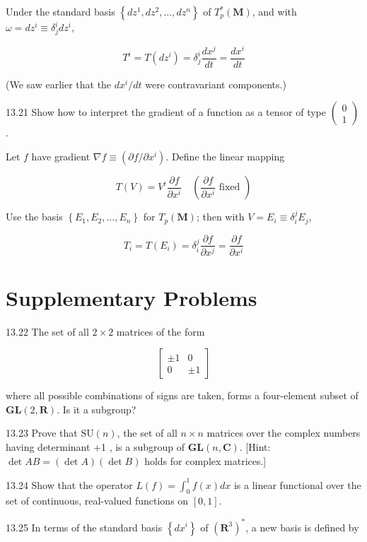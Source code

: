 \documentclass[10pt]{article}
\begin{document}
Under the standard basis $\left\{d z^{1}, d z^{2}, \ldots, d z^{n}\right\}$ of $T_{p}^{*}(\mathbf{M})$, and with $\omega=d z^{i} \equiv \delta_{j}^{i} d z^{i}$,

$$
T^{i}=T\left(d z^{i}\right)=\delta_{j}^{i} \frac{d x^{j}}{d t}=\frac{d x^{i}}{d t}
$$

(We saw earlier that the $d x^{i} / d t$ were contravariant components.)

13.21 Show how to interpret the gradient of a function as a tensor of type $\left(\begin{array}{l}0 \\ 1\end{array}\right)$.

Let $f$ have gradient $\nabla f \equiv\left(\partial f / \partial x^{i}\right)$. Define the linear mapping

$$
T(V)=V^{i} \frac{\partial f}{\partial x^{i}} \quad\left(\frac{\partial f}{\partial x^{i}} \text { fixed }\right)
$$

Use the basis $\left\{E_{1}, E_{2}, \ldots, E_{n}\right\}$ for $T_{p}(\mathbf{M})$; then with $V=E_{i} \equiv \delta_{i}^{j} E_{j}$,

$$
T_{i}=T\left(E_{i}\right)=\delta_{i}^{j} \frac{\partial f}{\partial x^{j}}=\frac{\partial f}{\partial x^{i}}
$$

\section*{Supplementary Problems}
13.22 The set of all $2 \times 2$ matrices of the form

$$
\left[\begin{array}{rr} 
\pm 1 & 0 \\
0 & \pm 1
\end{array}\right]
$$

where all possible combinations of signs are taken, forms a four-element subset of $\mathbf{G L}(2, \mathbf{R})$. Is it a subgroup?

13.23 Prove that $\mathrm{SU}(n)$, the set of all $n \times n$ matrices over the complex numbers having determinant +1 , is a subgroup of $\mathbf{G L}(n, \mathbf{C})$. [Hint: $\operatorname{det} A B=(\operatorname{det} A)(\operatorname{det} B)$ holds for complex matrices.]

13.24 Show that the operator $L(f)=\int_{0}^{1} f(x) d x$ is a linear functional over the set of continuous, real-valued functions on $[0,1]$.

13.25 In terms of the standard basis $\left\{d x^{i}\right\}$ of $\left(\mathbf{R}^{3}\right)^{*}$, a new basis is defined by
\end{document}
